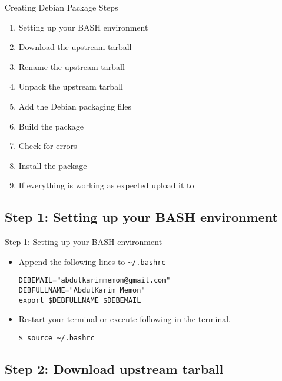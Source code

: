 \documentclass[red,10pt,a4paper]{beamer}
\begin{document}
\begin{frame}{Creating Debian Package Steps}
\begin{enumerate}
	\item Setting up your BASH environment
	\item Download the upstream tarball
	\item Rename the upstream tarball
	\item Unpack the upstream tarball
	\item Add the Debian packaging files
	\item Build the package
	\item Check for errors
	\item Install the package
	\item If everything is working as expected upload it to 
\end{enumerate}

\end{frame}

\subsection{Step 1: Setting up your BASH environment}

\begin{frame}[fragile]{Step 1: Setting up your BASH environment}
\begin{itemize}
\item Append the following lines to \lstinline|~/.bashrc| 

\begin{lstlisting}
DEBEMAIL="abdulkarimmemon@gmail.com"
DEBFULLNAME="AbdulKarim Memon"
export $DEBFULLNAME $DEBEMAIL
    \end{lstlisting} 

\item Restart your terminal or execute following in the terminal.

\begin{lstlisting}
$ source ~/.bashrc
\end{lstlisting}

\end{itemize}
\end{frame}


\subsection{Step 2: Download upstream tarball}
\end{document}
